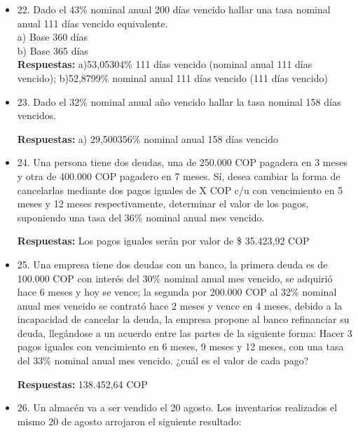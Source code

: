 \begin{itemize}
       \textbf{Respuestas:} 37.3349\% 300 días vencido 
       \medskip

 \item 22. Dado el 43\% nominal anual 200 días vencido hallar una tasa nominal anual 111 días vencido equivalente.\\

       a) Base 360 días\\
       b) Base 365 días\\

       \textbf{Respuestas:} a)53,05304\% 111 días vencido (nominal anual 111 días vencido); b)52,8799\% nominal anual 111 días vencido (111 días vencido)
       \medskip

 \item 23. Dado el 32\% nominal anual año vencido hallar la tasa nominal 158 días vencidos.
 
       \textbf{Respuestas:} a) 29,500356\% nominal anual 158 días vencido 
       \medskip

 \item 24. Una persona tiene dos deudas, una de 250.000 COP pagadera en 3 meses y otra de 400.000 COP pagadero en 7 meses. Sí, desea cambiar la forma de cancelarlas mediante dos pagos iguales de X COP c/u con vencimiento en 5 meses y 12 meses respectivamente, determinar el valor de los pagos, suponiendo una tasa del 36\% nominal anual mes vencido.
 
   \textbf{Respuestas:} Los pagos iguales serán por valor de \$ 35.423,92 COP
       \medskip

 \item 25. Una empresa tiene dos deudas con un banco, la primera deuda es de 100.000 COP con interés del 30\% nominal anual mes vencido, se adquirió hace 6 meses y hoy se vence; la segunda por 200.000 COP al 32\% nominal anual mes vencido se contrató hace 2 meses y vence en 4 meses, debido a la incapacidad de cancelar la deuda, la empresa propone al banco refinanciar su deuda, llegándose a un acuerdo entre las partes de la siguiente forma: Hacer 3 pagos iguales con vencimiento en 6 meses, 9 meses y 12 meses, con una tasa del 33\% nominal anual mes vencido. ¿cuál es el valor de cada pago?
 
       \textbf{Respuestas:} 138.452,64 COP
       \medskip

 \item 26. Un almacén va a ser vendido el 20 agosto. Los inventarios realizados el mismo 20 de agosto arrojaron el siguiente resultado:\\


\end{itemize}
